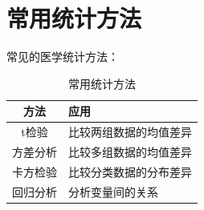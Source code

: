\documentclass[12pt,UTF8]{ctexbook}
\begin{document}
\section{常用统计方法}
\label{sec:statistical_methods}

常见的医学统计方法：
\begin{table}[htbp]
    \centering
    \caption{常用统计方法}
    \begin{tabular}{|c|p{8cm}|}
        \hline
        \textbf{方法} & \textbf{应用} \\
        \hline
        t检验 & 比较两组数据的均值差异 \\
        \hline
       方差分析 & 比较多组数据的均值差异 \\
        \hline
       卡方检验 & 比较分类数据的分布差异 \\
        \hline
       回归分析 & 分析变量间的关系 \\
        \hline
    \end{tabular}
\end{table}

\backmatter
\end{document}
